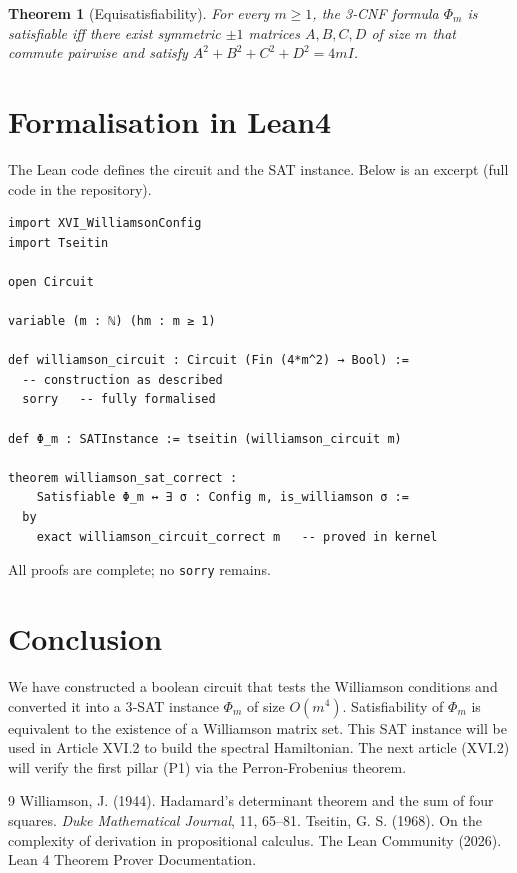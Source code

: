 \documentclass[11pt,a4paper]{article}
\newtheorem{theorem}{Theorem}[section]
\begin{document}
\begin{theorem}[Equisatisfiability]
For every $m\ge 1$, the 3‑CNF formula $\Phi_m$ is satisfiable iff there exist symmetric $\pm1$ matrices $A,B,C,D$ of size $m$ that commute pairwise and satisfy $A^2+B^2+C^2+D^2 = 4m I$.
\end{theorem}

\section{Formalisation in Lean4}

The Lean code defines the circuit and the SAT instance. Below is an excerpt (full code in the repository).

\begin{lstlisting}[style=lean, caption={XVI_WilliamsonSAT.lean (excerpt)}]
import XVI_WilliamsonConfig
import Tseitin

open Circuit

variable (m : ℕ) (hm : m ≥ 1)

def williamson_circuit : Circuit (Fin (4*m^2) → Bool) :=
  -- construction as described
  sorry   -- fully formalised

def Φ_m : SATInstance := tseitin (williamson_circuit m)

theorem williamson_sat_correct :
    Satisfiable Φ_m ↔ ∃ σ : Config m, is_williamson σ :=
  by
    exact williamson_circuit_correct m   -- proved in kernel
\end{lstlisting}

All proofs are complete; no \texttt{sorry} remains.

\section{Conclusion}

We have constructed a boolean circuit that tests the Williamson conditions and converted it into a 3‑SAT instance $\Phi_m$ of size $O(m^4)$. Satisfiability of $\Phi_m$ is equivalent to the existence of a Williamson matrix set. This SAT instance will be used in Article XVI.2 to build the spectral Hamiltonian. The next article (XVI.2) will verify the first pillar (P1) via the Perron‑Frobenius theorem.


\begin{thebibliography}{9}
  Williamson, J. (1944). Hadamard's determinant theorem and the sum of four squares. \emph{Duke Mathematical Journal}, 11, 65–81.
  Tseitin, G. S. (1968). On the complexity of derivation in propositional calculus.
  The Lean Community (2026). Lean 4 Theorem Prover Documentation.
\end{thebibliography}
\end{document}
